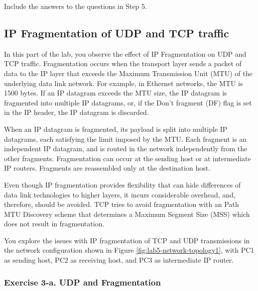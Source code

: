 Include the answers to the questions in Step 5.
\begin{questions}
\end{questions}

\newpage
\subsection{IP Fragmentation of UDP and TCP traffic}

In this part of the lab, you observe the effect of IP Fragmentation on UDP and TCP traffic. Fragmentation occurs when the transport layer sends a packet of data to the IP layer that exceeds the Maximum Transmission Unit (MTU) of the underlying data link network. For example, in Ethernet networks, the MTU is 1500 bytes. If an IP datagram exceeds the MTU size, the IP datagram is fragmented into multiple IP datagrams, or, if the Don’t fragment (DF) flag is set in the IP header, the IP datagram is discarded.

When an IP datagram is fragmented, its payload is split into multiple IP datagrams, each satisfying the limit imposed by the MTU. Each fragment is an independent IP datagram, and is routed in the network independently from the other fragments. Fragmentation can occur at the sending host or at intermediate IP routers. Fragments are reassembled only at the destination host.

Even though IP fragmentation provides flexibility that can hide differences of data link technologies to higher layers, it incurs considerable overhead, and, therefore, should be avoided. TCP tries to avoid fragmentation with an Path MTU Discovery scheme that determines a Maximum Segment Size (MSS) which does not result in fragmentation.

You explore the issues with IP fragmentation of TCP and UDP transmissions in the network configuration shown in Figure \ref{fig:lab5-network-topology1}, with PC1 as sending host, PC2 as receiving host, and PC3 as intermediate IP router.

\subsubsection{Exercise 3-a. UDP and Fragmentation}

